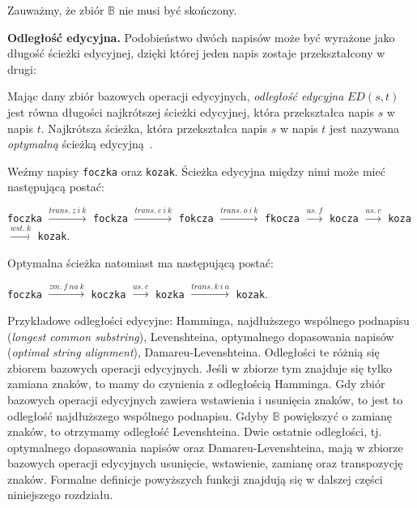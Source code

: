 \documentclass{praca1}
\begin{document}
Zauważmy, że zbiór $\mathbb{B}$ nie musi być skończony.

\textbf{Odległość edycyjna.} Podobieństwo dwóch napisów może być wyrażone jako długość ścieżki edycyjnej, dzięki której jeden napis zostaje przekształcony w drugi:

\begin{definition}
Mając dany zbiór bazowych operacji edycyjnych, \emph{odległość edycyjna} $ED(s,t)$ jest równa długości najkrótszej ścieżki edycyjnej, która przekształca napis $s$ w napis $t$. Najkrótsza ścieżka, która przekształca napis $s$ w napis $t$ jest nazywana \emph{optymalną} ścieżką edycyjną~\cite{Boytsov2011:indexingmethods}. 
\end{definition}

\begin{example}
Weźmy napisy \verb|foczka| oraz \verb|kozak|. Ścieżka edycyjna między nimi może mieć następującą postać:

\verb|foczka|  $\xrightarrow{trans.\ z\ i\ k}$ \verb|fockza| $\xrightarrow{trans.\ c\ i\ k}$ \verb|fokcza| $\xrightarrow{trans.\ o\ i\ k}$ \verb|fkocza| $\xrightarrow{us.\ f}$ \verb|kocza| $\xrightarrow{us.\ c}$ \verb|koza| $\xrightarrow{wst.\ k}$ \verb|kozak|.

Optymalna ścieżka natomiast ma następującą postać:

\verb|foczka| $\xrightarrow{zm.\ f\ na\ k}$ \verb|koczka|  $\xrightarrow{us.\ c}$ \verb|kozka| $\xrightarrow{trans.\ k\ i\ a}$ \verb|kozak|.

\end{example}

Przykładowe odległości edycyjne: Hamminga, najdłuższego wspólnego podnapisu (\emph{longest common substring}), Levenshteina, optymalnego dopasowania napisów (\emph{optimal string alignment}), Damareu-Levenshteina. Odległości te różnią się zbiorem bazowych operacji edycyjnych. Jeśli w zbiorze tym znajduje się tylko zamiana znaków, to mamy do czynienia z odległością Hamminga. Gdy zbiór bazowych operacji edycyjnych zawiera wstawienia i usunięcia znaków, to jest to odległość najdłuższego wspólnego podnapisu. Gdyby $\mathbb{B}$ powiększyć o zamianę znaków, to otrzymamy odległość Levenshteina. Dwie ostatnie odległości, tj. optymalnego dopasowania napisów oraz Damareu-Levenshteina, mają w zbiorze bazowych operacji edycyjnych usunięcie, wstawienie, zamianę oraz transpozycję znaków. Formalne definicje powyższych funkcji znajdują się w dalszej części niniejszego rozdziału.
\end{document}
